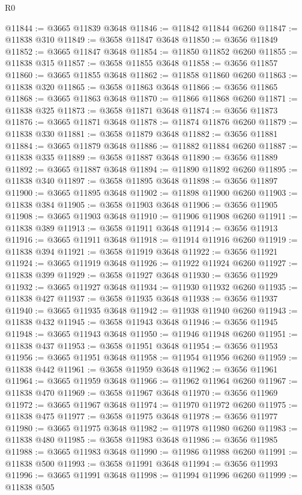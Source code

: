 \begin{lexlean}{R0}
\begin{coremodule}
@11844 := @3665 @11839 @3648
@11846 := @11842 @11844 @6260
@11847 := @11838 @310
@11849 := @3658 @11847 @3648
@11850 := @3656 @11849
@11852 := @3665 @11847 @3648
@11854 := @11850 @11852 @6260
@11855 := @11838 @315
@11857 := @3658 @11855 @3648
@11858 := @3656 @11857
@11860 := @3665 @11855 @3648
@11862 := @11858 @11860 @6260
@11863 := @11838 @320
@11865 := @3658 @11863 @3648
@11866 := @3656 @11865
@11868 := @3665 @11863 @3648
@11870 := @11866 @11868 @6260
@11871 := @11838 @325
@11873 := @3658 @11871 @3648
@11874 := @3656 @11873
@11876 := @3665 @11871 @3648
@11878 := @11874 @11876 @6260
@11879 := @11838 @330
@11881 := @3658 @11879 @3648
@11882 := @3656 @11881
@11884 := @3665 @11879 @3648
@11886 := @11882 @11884 @6260
@11887 := @11838 @335
@11889 := @3658 @11887 @3648
@11890 := @3656 @11889
@11892 := @3665 @11887 @3648
@11894 := @11890 @11892 @6260
@11895 := @11838 @340
@11897 := @3658 @11895 @3648
@11898 := @3656 @11897
@11900 := @3665 @11895 @3648
@11902 := @11898 @11900 @6260
@11903 := @11838 @384
@11905 := @3658 @11903 @3648
@11906 := @3656 @11905
@11908 := @3665 @11903 @3648
@11910 := @11906 @11908 @6260
@11911 := @11838 @389
@11913 := @3658 @11911 @3648
@11914 := @3656 @11913
@11916 := @3665 @11911 @3648
@11918 := @11914 @11916 @6260
@11919 := @11838 @394
@11921 := @3658 @11919 @3648
@11922 := @3656 @11921
@11924 := @3665 @11919 @3648
@11926 := @11922 @11924 @6260
@11927 := @11838 @399
@11929 := @3658 @11927 @3648
@11930 := @3656 @11929
@11932 := @3665 @11927 @3648
@11934 := @11930 @11932 @6260
@11935 := @11838 @427
@11937 := @3658 @11935 @3648
@11938 := @3656 @11937
@11940 := @3665 @11935 @3648
@11942 := @11938 @11940 @6260
@11943 := @11838 @432
@11945 := @3658 @11943 @3648
@11946 := @3656 @11945
@11948 := @3665 @11943 @3648
@11950 := @11946 @11948 @6260
@11951 := @11838 @437
@11953 := @3658 @11951 @3648
@11954 := @3656 @11953
@11956 := @3665 @11951 @3648
@11958 := @11954 @11956 @6260
@11959 := @11838 @442
@11961 := @3658 @11959 @3648
@11962 := @3656 @11961
@11964 := @3665 @11959 @3648
@11966 := @11962 @11964 @6260
@11967 := @11838 @470
@11969 := @3658 @11967 @3648
@11970 := @3656 @11969
@11972 := @3665 @11967 @3648
@11974 := @11970 @11972 @6260
@11975 := @11838 @475
@11977 := @3658 @11975 @3648
@11978 := @3656 @11977
@11980 := @3665 @11975 @3648
@11982 := @11978 @11980 @6260
@11983 := @11838 @480
@11985 := @3658 @11983 @3648
@11986 := @3656 @11985
@11988 := @3665 @11983 @3648
@11990 := @11986 @11988 @6260
@11991 := @11838 @500
@11993 := @3658 @11991 @3648
@11994 := @3656 @11993
@11996 := @3665 @11991 @3648
@11998 := @11994 @11996 @6260
@11999 := @11838 @505

\end{coremodule}
\end{lexlean}
